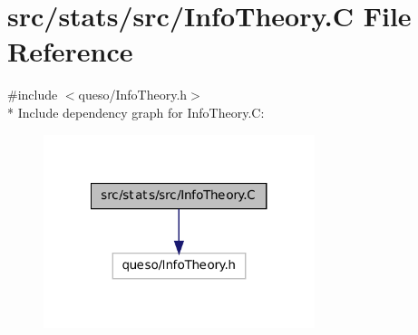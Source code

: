 \hypertarget{_info_theory_8_c}{\section{src/stats/src/\-Info\-Theory.C File Reference}
\label{_info_theory_8_c}
}
{\ttfamily \#include $<$queso/\-Info\-Theory.\-h$>$}\\*
Include dependency graph for Info\-Theory.\-C\-:
\nopagebreak
\begin{figure}[H]
\begin{center}
\leavevmode
\includegraphics[width=224pt]{_info_theory_8_c__incl}
\end{center}
\end{figure}
